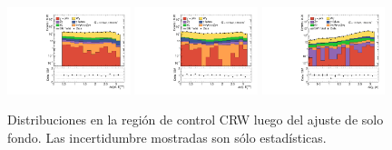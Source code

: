 \begin{figure}[ht!]
\begin{center}
    \includegraphics[width=0.32\textwidth]{images_tmp/results/fr2/can_CRW_dphi_jetmet_afterFit.pdf}
    \includegraphics[width=0.32\textwidth]{images_tmp/results/fr2/can_CRW_dphi_gammet_afterFit.pdf}
    \includegraphics[width=0.32\textwidth]{images_tmp/results/fr2/can_CRW_dphi_gamjet_afterFit.pdf}
    \caption{Distribuciones en la región de control CRW luego del ajuste de solo fondo. Las incertidumbre mostradas son sólo estadísticas.}
    \label{fig:crw_dist}
  \end{center}
\end{figure}

